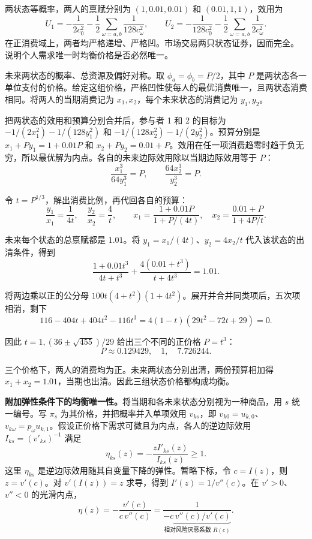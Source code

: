 \begin{tcolorbox}[example,title=补充：个人需求唯一与多重均衡]
\begin{question}
两状态等概率，两人的禀赋分别为 $(1,0.01,0.01)$ 和 $(0.01,1,1)$，效用为
\[
 U_1=-\frac1{2c_0^2}-\frac12\sum_{\omega=a,b}\frac1{128c_\omega^2},\qquad
 U_2=-\frac1{128c_0^2}-\frac12\sum_{\omega=a,b}\frac1{2c_\omega^2}.
\]
在正消费域上，两者均严格递增、严格凹。市场交易两只状态证券，因而完全。
说明个人需求唯一时均衡价格是否必然唯一。
\end{question}
\begin{solution}[blank-type=manual]
未来两状态的概率、总资源及偏好对称。取 $\phi_a=\phi_b=P/2$，其中 $P$ 是两状态各一单位支付的价格。给定这组价格，严格凹性使每人的最优消费唯一，且两状态消费相同。将两人的当期消费记为 $x_1,x_2$，每个未来状态的消费记为 $y_1,y_2$。

把两状态的效用和预算分别合并后，参与者 1 和 2 的目标为 $-1/(2x_1^2)-1/(128y_1^2)$ 和 $-1/(128x_2^2)-1/(2y_2^2)$。预算分别是 $x_1+Py_1=1+0.01P$ 和 $x_2+Py_2=0.01+P$。效用在任一项消费趋零时趋于负无穷，所以最优解为内点。各自的未来边际效用除以当期边际效用等于 $P$：
\[
 \frac{x_1^3}{64y_1^3}=P,\qquad
 \frac{64x_2^3}{y_2^3}=P.
\]

令 $t=P^{1/3}$，解出消费比例，再代回各自的预算：
\[
 \frac{y_1}{x_1}=\frac1{4t},\quad
 \frac{y_2}{x_2}=\frac4t,\qquad
 x_1=\frac{1+0.01P}{1+P/(4t)},\quad
 x_2=\frac{0.01+P}{1+4P/t}.
\]

未来每个状态的总禀赋都是 $1.01$。将 $y_1=x_1/(4t)$、$y_2=4x_2/t$ 代入该状态的出清条件，得到
\[
 \frac{1+0.01t^3}{4t+t^3}+\frac{4(0.01+t^3)}{t+4t^3}=1.01.
\]

将两边乘以正的公分母 $100t(4+t^2)(1+4t^2)$。展开并合并同类项后，五次项相消，剩下
\[
 116-404t+404t^2-116t^3
 =4(1-t)(29t^2-72t+29)=0.
\]

因此 $t=1,(36\pm\sqrt{455})/29$ 给出三个不同的正价格 $P=t^3$：
\[
 P\approx0.129429,\quad1,\quad7.726244.
\]

三个价格下，两人的消费均为正。未来两状态分别出清，两份预算相加得 $x_1+x_2=1.01$，当期也出清。因此三组状态价格都构成均衡。
\end{solution}
\end{tcolorbox}

\textbf{附加弹性条件下的均衡唯一性。}将当期和各未来状态分别视为一种商品，用 $s$ 统一编号。写 $\pi_s$ 为其价格，并把概率并入单项效用 $v_{ks}$，即 $v_{k0}=u_{k,0}$、$v_{k\omega}=p_\omega u_{k,1}$。假设正价格下需求可微且为内点，各人的逆边际效用 $I_{ks}=(v'_{ks})^{-1}$ 满足
\[
 \eta_{ks}(z)=-\frac{z I'_{ks}(z)}{I_{ks}(z)}\ge 1.
\]
这里 $\eta_{ks}$ 是逆边际效用随其自变量下降的弹性。暂略下标，令 $c=I(z)$，则 $z=v'(c)$。对 $v'(I(z))=z$ 求导，得到 $I'(z)=1/v''(c)$。在 $v'>0$、$v''<0$ 的光滑内点，
\[
 \eta(z)=-\frac{v'(c)}{c\,v''(c)}
 =\frac{1}{\underbrace{-c\,v''(c)/v'(c)}_{\text{相对风险厌恶系数 }R(c)}}.
\]

